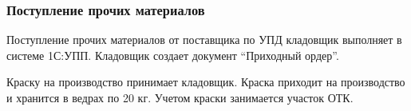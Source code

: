 




\subsubsection{Поступление прочих материалов}

Поступление прочих материалов от поставщика по УПД кладовщик выполняет в системе 1С:УПП. Кладовщик создает документ “Приходный ордер”.

Краску на производство принимает кладовщик. Краска приходит на производство и хранится в ведрах по 20 кг. 
Учетом краски занимается участок ОТК. 






